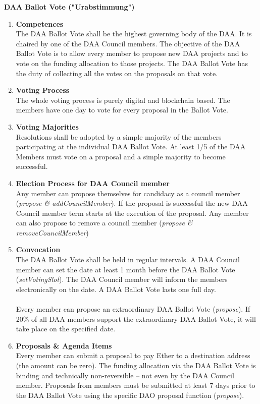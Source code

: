 \item \textbf{DAA Ballot Vote ("Urabstimmung")} \\
\begin{enumerate}[label=\textbf{\arabic*.}]
    \item \textbf{Competences} \\
    The DAA Ballot Vote shall be the highest governing body of the DAA.
    It is chaired by one of the DAA Council members.
    The objective of the DAA Ballot Vote is to allow every member to propose new DAA projects and to vote on the funding allocation to those projects.
    The DAA Ballot Vote has the duty of collecting all the votes on the proposals on that vote.

    \item \textbf{Voting Process} \\
    The whole voting process is purely digital and blockchain based.
    The members have one day to vote for every proposal in the Ballot Vote.

    \item \textbf{Voting Majorities} \\
    Resolutions shall be adopted by a simple majority of the members participating at the individual DAA Ballot Vote.
    At least 1/5 of the DAA Members must vote on a proposal and a simple majority to become successful.

    \item \textbf{Election Process for DAA Council member} \\
    Any member can propose themselves for candidacy as a council member (\emph{propose \& addCouncilMember}).
    If the proposal is successful the new DAA Council member term starts at the execution of the proposal.
    Any member can also propose to remove a council member (\emph{propose \& removeCouncilMember})

    \item \textbf{Convocation} \\
    The DAA Ballot Vote shall be held in regular intervals.
    A DAA Council member can set the date at least 1 month before the DAA Ballot Vote (\emph{setVotingSlot}).
    The DAA Council member will inform the members electronically on the date.
    A DAA Ballot Vote lasts one full day. \\ \\

    Every member can propose an extraordinary DAA Ballot Vote (\emph{propose}).
    If 20\% of all DAA members support the extraordinary DAA Ballot Vote, it will take place on the specified date.

    \item \textbf{Proposals \& Agenda Items} \\
    Every member can submit a proposal to pay Ether to a destination address (the amount can be zero).
    The funding allocation via the DAA Ballot Vote is binding and technically non-reversible – not even by the DAA Council member.
    Proposals from members must be submitted at least 7 days prior to the DAA Ballot Vote using the specific DAO proposal function (\emph{propose}).

\end{enumerate}

